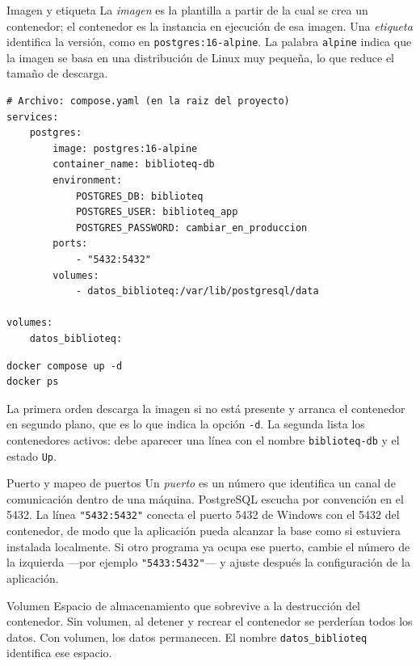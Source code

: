 \documentclass[11pt,a4paper,openany]{book}
\begin{document}
\begin{cajadefinicion}{Imagen y etiqueta}
	La \emph{imagen} es la plantilla a partir de la cual se crea un contenedor; el contenedor es la instancia en ejecución de esa imagen. Una \emph{etiqueta} identifica la versión, como en \texttt{postgres:16-alpine}. La palabra \texttt{alpine} indica que la imagen se basa en una distribución de Linux muy pequeña, lo que reduce el tamaño de descarga.
\end{cajadefinicion}

\begin{lstlisting}[style=yaml,caption={Archivo compose.yaml para levantar PostgreSQL en desarrollo.},label={lst:compose}]
# Archivo: compose.yaml (en la raiz del proyecto)
services:
	postgres:
		image: postgres:16-alpine
		container_name: biblioteq-db
		environment:
			POSTGRES_DB: biblioteq
			POSTGRES_USER: biblioteq_app
			POSTGRES_PASSWORD: cambiar_en_produccion
		ports:
			- "5432:5432"
		volumes:
			- datos_biblioteq:/var/lib/postgresql/data

volumes:
	datos_biblioteq:
\end{lstlisting}

\begin{lstlisting}[style=shell,caption={Puesta en marcha y verificacion del contenedor de base de datos.},label={lst:compose-run}]
docker compose up -d
docker ps
\end{lstlisting}

La primera orden descarga la imagen si no está presente y arranca el contenedor en segundo plano, que es lo que indica la opción \texttt{-d}. La segunda lista los contenedores activos: debe aparecer una línea con el nombre \texttt{biblioteq-db} y el estado \texttt{Up}.

\begin{cajadefinicion}{Puerto y mapeo de puertos}
	Un \emph{puerto} es un número que identifica un canal de comunicación dentro de una máquina. PostgreSQL escucha por convención en el 5432. La línea \texttt{"5432:5432"} conecta el puerto 5432 de Windows con el 5432 del contenedor, de modo que la aplicación pueda alcanzar la base como si estuviera instalada localmente. Si otro programa ya ocupa ese puerto, cambie el número de la izquierda ---por ejemplo \texttt{"5433:5432"}--- y ajuste después la configuración de la aplicación.
\end{cajadefinicion}

\begin{cajadefinicion}{Volumen}
	Espacio de almacenamiento que sobrevive a la destrucción del contenedor. Sin volumen, al detener y recrear el contenedor se perderían todos los datos. Con volumen, los datos permanecen. El nombre \texttt{datos\_biblioteq} identifica ese espacio.
\end{cajadefinicion}
\end{document}
